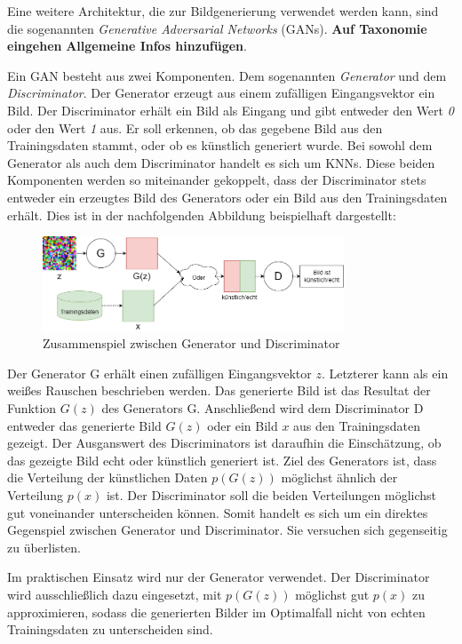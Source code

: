\label{chap:GANs}

Eine weitere Architektur, die zur Bildgenerierung verwendet werden kann, sind die sogenannten \emph{Generative Adversarial Networks} (\acsp{GAN}). \textbf{Auf Taxonomie eingehen} \textbf{Allgemeine Infos hinzufügen}.

Ein \ac{GAN} besteht aus zwei Komponenten. Dem sogenannten \emph{Generator} und dem \emph{Discriminator}.
Der Generator erzeugt aus einem zufälligen Eingangsvektor ein Bild. Der Discriminator erhält ein Bild als Eingang und gibt entweder den Wert \emph{0} oder den Wert \emph{1} aus. Er soll erkennen, ob das gegebene Bild aus den Trainingsdaten stammt, oder ob es künstlich generiert wurde. Bei sowohl dem Generator als auch dem Discriminator handelt es sich um \acp{KNN}. Diese beiden Komponenten werden so miteinander gekoppelt, dass der Discriminator stets entweder ein erzeugtes Bild des Generators oder ein Bild aus den Trainingsdaten erhält. Dies ist in der nachfolgenden Abbildung beispielhaft dargestellt:
\begin{figure}[H]
	\centering
	\includegraphics[width=0.8\textwidth]{../images/GANs/GAN.drawio.png}
	\caption{Zusammenspiel zwischen Generator und Discriminator}
	\label{fig:gan}
\end{figure}
Der Generator G erhält einen zufälligen Eingangsvektor $z$. Letzterer kann als ein weißes Rauschen beschrieben werden. Das generierte Bild ist das Resultat der Funktion $G(z)$ des Generators G. Anschließend wird dem Discriminator D entweder das generierte Bild $G(z)$ oder ein Bild $x$ aus den Trainingsdaten gezeigt. Der Ausganswert des Discriminators ist daraufhin die Einschätzung, ob das gezeigte Bild echt oder künstlich generiert ist. Ziel des Generators ist, dass die Verteilung der künstlichen Daten $p(G(z))$ möglichst ähnlich der Verteilung $p(x)$ ist. Der Discriminator soll die beiden Verteilungen möglichst gut voneinander unterscheiden können. Somit handelt es sich um ein direktes Gegenspiel zwischen Generator und Discriminator. Sie versuchen sich gegenseitig zu überlisten.

Im praktischen Einsatz wird nur der Generator verwendet. Der Discriminator wird ausschließlich dazu eingesetzt, mit $p(G(z))$ möglichst gut $p(x)$ zu approximieren, sodass die generierten Bilder im Optimalfall nicht von echten Trainingsdaten zu unterscheiden sind.

